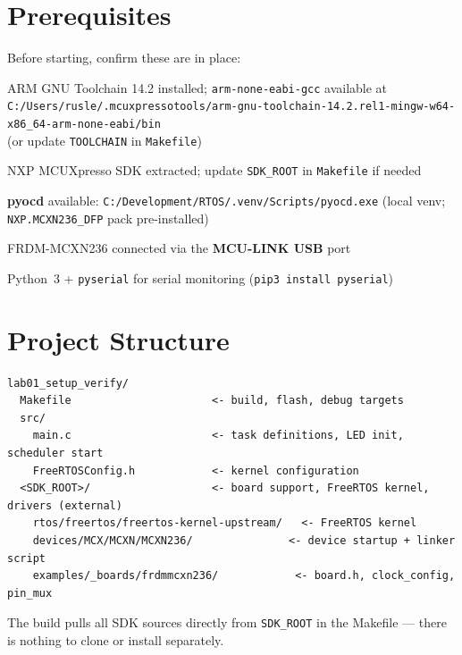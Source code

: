 \documentclass[11pt, a4paper]{article}
\newcommand{\file}[1]{\texttt{\small #1}}
\begin{document}
\section{Prerequisites}

Before starting, confirm these are in place:

\begin{checklist}
  \item ARM GNU Toolchain 14.2 installed; \texttt{arm-none-eabi-gcc} available at\\
        \texttt{C:/Users/rusle/.mcuxpressotools/arm-gnu-toolchain-14.2.rel1-mingw-w64-x86\_64-arm-none-eabi/bin}\\
        (or update \texttt{TOOLCHAIN} in \file{Makefile})
  \item NXP MCUXpresso SDK extracted; update \texttt{SDK\_ROOT} in \file{Makefile} if needed
  \item \textbf{pyocd} available: \texttt{C:/Development/RTOS/.venv/Scripts/pyocd.exe}
        (local venv; \texttt{NXP.MCXN236\_DFP} pack pre-installed)
  \item FRDM-MCXN236 connected via the \textbf{MCU-LINK USB} port
  \item Python~3 + \texttt{pyserial} for serial monitoring (\texttt{pip3 install pyserial})
\end{checklist}

\section{Project Structure}

\begin{lstlisting}[style=textstyle]
lab01_setup_verify/
  Makefile                      <- build, flash, debug targets
  src/
    main.c                      <- task definitions, LED init, scheduler start
    FreeRTOSConfig.h            <- kernel configuration
  <SDK_ROOT>/                   <- board support, FreeRTOS kernel, drivers (external)
    rtos/freertos/freertos-kernel-upstream/   <- FreeRTOS kernel
    devices/MCX/MCXN/MCXN236/               <- device startup + linker script
    examples/_boards/frdmmcxn236/            <- board.h, clock_config, pin_mux
\end{lstlisting}

The build pulls all SDK sources directly from \texttt{SDK\_ROOT} in the Makefile ---
there is nothing to clone or install separately.
\end{document}
